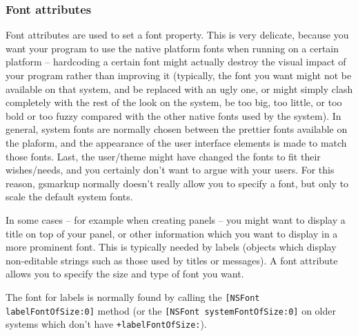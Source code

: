 \subsubsection{Font attributes}
Font attributes are used to set a font property.  This is very
delicate, because you want your program to use the native platform
fonts when running on a certain platform -- hardcoding a certain font
might actually destroy the visual impact of your program rather than
improving it (typically, the font you want might not be available on
that system, and be replaced with an ugly one, or might simply clash
completely with the rest of the look on the system, be too big, too
little, or too bold or too fuzzy compared with the other native fonts
used by the system).  In general, system fonts are normally chosen
between the prettier fonts available on the plaform, and the
appearance of the user interface elements is made to match those
fonts.  Last, the user/theme might have changed the fonts to fit their
wishes/needs, and you certainly don't want to argue with your users.
For this reason, gsmarkup normally doesn't really allow you to specify a
font, but only to scale the default system fonts.

In some cases -- for example when creating panels -- you might want to
display a title on top of your panel, or other information which you
want to display in a more prominent font.  This is typically needed by
labels (objects which display non-editable strings such as those used
by titles or messages).  A font attribute allows you to specify the
size and type of font you want.

The font for labels is normally found by calling the \texttt{[NSFont
labelFontOfSize:0]} method (or the \texttt{[NSFont systemFontOfSize:0]} 
on older systems which don't have \texttt{+labelFontOfSize:}).


